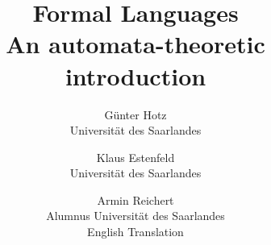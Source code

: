 \documentclass{amsbook}
\begin{document}
\title{
	Formal Languages\\
	An automata-theoretic introduction}

\author{
	G\"unter Hotz\\
	Universit\"at des Saarlandes
\and
	Klaus Estenfeld\\
	Universit\"at des Saarlandes
\and
	Armin Reichert\\
	Alumnus Universit\"at des Saarlandes\\
	English Translation
}

\maketitle


\tableofcontents


\end{document}
